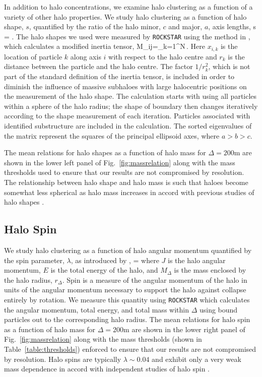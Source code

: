 \documentclass[usenatbib,fleqn]{mnras}
\begin{document}
In addition to halo concentrations, we examine halo clustering as a function of a variety of other halo properties. We study halo clustering as a function of halo shape, $s$, quantified by the ratio of the halo minor, $c$ and major, $a$, axis lengths, 
%
\beq
s = .
\eeq
%
The halo shapes we used were measured by {\tt ROCKSTAR} using the method in \cite{allgood_etal06}, which calculates a modified inertia tensor,
\beq
M_{ij}=\sum\limits_{k=1}^{N}\,.
\eeq
Here $x_{i,k}$ is the location of particle $k$ along axis $i$ with respect to the halo centre and $r_{k}$ is the distance between the particle and the halo centre. The factor $1/r_{k}^2$, which is not part of the standard definition of the inertia tensor, is included in order to diminish the influence of massive subhaloes with large halocentric positions on the measurement of the halo shape. The calculation starts with using all particles within a sphere of the halo radius; the shape of boundary then changes iteratively according to the shape measurement of each iteration. Particles associated with identified substructure are included in the calculation. The sorted eigenvalues of the matrix represent the squares of the principal ellipsoid axes, where $a > b > c$. 

The mean relations for halo shapes as a function of halo mass for $\Delta=200$m are shown in the lower left panel of Fig.~\ref{fig:massrelation} along with the mass thresholds used to ensure that our results are not compromised by resolution. The relationship between halo shape and halo mass is such that haloes become somewhat less spherical as halo mass increases in accord with previous studies of halo shapes \citep[e.g.,][]{jing_suto02,allgood_etal06}.

\subsection{Halo Spin}

We study halo clustering as a function of halo angular momentum quantified by the spin parameter, $\lambda$, as introduced by \citep{peebles69},
\beq
\lambda = 
\eeq
where $J$ is the halo angular momentum, $E$ is the total energy of the halo, and $M_{\Delta}$ is the mass enclosed by the halo radius, $r_{\Delta}$. Spin is a measure of the angular momentum of the halo in units of the angular momentum necessary to support the halo against collapse entirely by rotation. We measure this quantity using {\tt ROCKSTAR} which calculates the angular momentum, total energy, and total mass within $\Delta$ using bound particles out to the corresponding halo radius. The mean relations for halo spin as a function of halo mass for $\Delta=200$m are shown in the lower right panel of Fig.~\ref{fig:massrelation} along with the mass thresholds (shown in Table~\ref{table:thresholds}) enforced to ensure that our results are not compromised by resolution. Halo spins are typically $\lambda \sim 0.04$ and exhibit only a very weak mass dependence in accord with independent studies of halo spin 
\citep[e.g.][]{bullock_etal02,maccio_etal07}.
\end{document}
